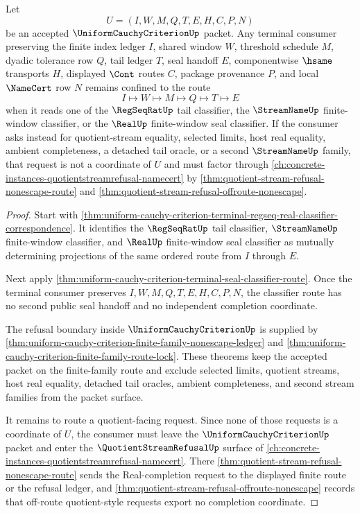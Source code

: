 
\begin{theorem}
\label{thm:uniform-cauchy-criterion-terminal-quotient-refusal-boundary}
Let
$$
U=(I,W,M,Q,T,E,H,C,P,N)
$$
be an accepted $\UniformCauchyCriterionUp$ packet. Any terminal consumer preserving the finite index ledger $I$, shared window $W$, threshold schedule $M$, dyadic tolerance row $Q$, tail ledger $T$, seal handoff $E$, componentwise $\hsame$ transports $H$, displayed $\Cont$ routes $C$, package provenance $P$, and local $\NameCert$ row $N$ remains confined to the route
$$
I \longmapsto W \longmapsto M \longmapsto Q \longmapsto T \longmapsto E
$$
when it reads one of the $\RegSeqRatUp$ tail classifier, the $\StreamNameUp$ finite-window classifier, or the $\RealUp$ finite-window seal classifier. If the consumer asks instead for quotient-stream equality, selected limits, host real equality, ambient completeness, a detached tail oracle, or a second $\StreamNameUp$ family, that request is not a coordinate of $U$ and must factor through \autoref{ch:concrete-instances-quotientstreamrefusal-namecert} by \autoref{thm:quotient-stream-refusal-nonescape-route} and \autoref{thm:quotient-stream-refusal-offroute-nonescape}.
\end{theorem}
\begin{proof}
Start with \autoref{thm:uniform-cauchy-criterion-terminal-regseq-real-classifier-correspondence}. It identifies the $\RegSeqRatUp$ tail classifier, $\StreamNameUp$ finite-window classifier, and $\RealUp$ finite-window seal classifier as mutually determining projections of the same ordered route from $I$ through $E$.

Next apply \autoref{thm:uniform-cauchy-criterion-terminal-seal-classifier-route}. Once the terminal consumer preserves $I,W,M,Q,T,E,H,C,P,N$, the classifier route has no second public seal handoff and no independent completion coordinate.

The refusal boundary inside $\UniformCauchyCriterionUp$ is supplied by \autoref{thm:uniform-cauchy-criterion-finite-family-nonescape-ledger} and \autoref{thm:uniform-cauchy-criterion-finite-family-route-lock}. These theorems keep the accepted packet on the finite-family route and exclude selected limits, quotient streams, host real equality, detached tail oracles, ambient completeness, and second stream families from the packet surface.

It remains to route a quotient-facing request. Since none of those requests is a coordinate of $U$, the consumer must leave the $\UniformCauchyCriterionUp$ packet and enter the $\QuotientStreamRefusalUp$ surface of \autoref{ch:concrete-instances-quotientstreamrefusal-namecert}. There \autoref{thm:quotient-stream-refusal-nonescape-route} sends the Real-completion request to the displayed finite route or the refusal ledger, and \autoref{thm:quotient-stream-refusal-offroute-nonescape} records that off-route quotient-style requests export no completion coordinate.
\end{proof}
